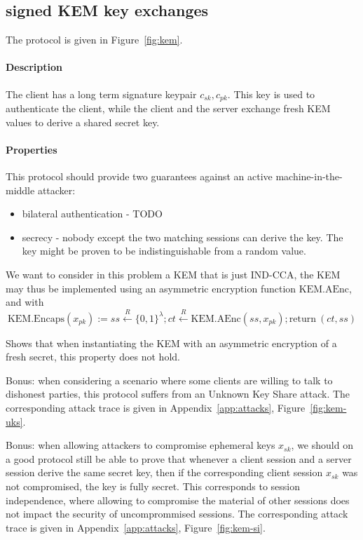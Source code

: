 \documentclass{article}
\newcommand{\store}{\leftarrow}
\newcommand{\getR}{\stackrel{R}{\store}}
\newcommand{\sfsk}{\mathit{sk}}
\newcommand{\sfpk}{\mathit{pk}}
\newcommand{\sfss}{\mathit{ss}}
\newcommand{\sfct}{\mathit{ct}}
\newcommand{\kwf}[1]{\mathrm{#1}}
\newcommand{\encaps}{\kwf{KEM.Encaps}}
\newcommand{\aenckem}{\kwf{KEM.AEnc}}
\newcommand{\return}{\kwf{return}}
\begin{document}
\subsection{signed KEM key exchanges}

The protocol is given in Figure~\ref{fig:kem}.

 \paragraph{Description} The client has a long term signature keypair $c_\sfsk,c_\sfpk$.
This key is used to authenticate the client, while the client and the server exchange fresh KEM values to derive a shared secret key.

\paragraph{Properties} This protocol should provide two guarantees against an active machine-in-the-middle attacker:
\begin{itemize}
\item bilateral authentication - TODO
\item secrecy - nobody except the two matching sessions can derive the key.  The key might be proven to be indistinguishable from a random value.
\end{itemize}


We want to consider in this problem a KEM that is just IND-CCA, the KEM may thus be implemented using an asymmetric encryption function $\aenckem$, and with
$$\encaps(x_\sfpk) := \sfss \getR \{0,1\}^\lambda; \sfct \getR \aenckem(\sfss,x_\sfpk); \return~(\sfct,\sfss)  $$

Shows that when instantiating the KEM with an asymmetric encryption of a fresh secret, this property does not hold.

Bonus: when considering a scenario where some clients are willing to talk to dishonest parties, this protocol suffers from an Unknown Key Share attack. The corresponding attack trace is given in Appendix~\ref{app:attacks}, Figure~\ref{fig:kem-uks}.


Bonus: when allowing attackers to compromise ephemeral keys $x_\sfsk$, we should on a good protocol still be able to prove that whenever a client session and a server session derive the same secret key, then if the corresponding client session $x_\sfsk$ was not compromised, the key is fully secret. This corresponds to session independence, where allowing to compromise the material of other sessions does not impact the security of uncomprommised sessions.  The corresponding attack trace is given in Appendix~\ref{app:attacks}, Figure~\ref{fig:kem-si}.
\end{document}
